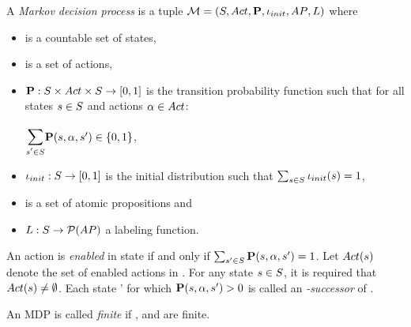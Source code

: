\documentclass[preview]{standalone}
\begin{document}
\begin{definition}
	A \emph{Markov decision process} is a tuple ${{\mathcal{M}}} = {({S}, {Act}, {\textbf{P}}, {\iota_{init}}, {AP}, {L})}$ where
	\begin{itemize}
		\item \states is a countable set of states,
		\item \actions is a set of actions,
		\item ${\textbf{P}} : {S} \times {Act} \times {S} \to [0,1]$ is the transition probability function such that for all states ${s} \in {S}$ and actions ${\alpha} \in {Act}$:
		\begin{center}
			$\bbigsum{\state' \in \states}\probtfunc(\state,\action,\state') \in \{0,1\}$,
		\end{center}
	\item ${\iota_{init}} : {S} \to [0,1]$ is the initial distribution such that $\sum_{{s} \in {S}} {\iota_{init}}({s}) = 1$,
	\item \atomicprops is  a set of atomic propositions and
	\item ${L} : {S} \to {\mathcal{P}(\ensuremath{{AP}})}$ a labeling function.
	\end{itemize}
	An action \action is \emph{enabled} in state \state if and only if $\sum_{{s}' \in {S}} {\textbf{P}}({s},{\alpha},{s}') = 1$. Let ${Act}({s})$ denote the set of enabled actions in \state. For any state ${s} \in {S}$, it is required that ${Act}({s}) \neq \emptyset$. Each state \state' for which ${\textbf{P}}({s},{\alpha},{s}') > 0$ is called an \emph{\action-successor} of \state.
\end{definition}

An MDP is called \emph{finite} if \states, \actions and \atomicprops are finite.
\\

\end{document}
